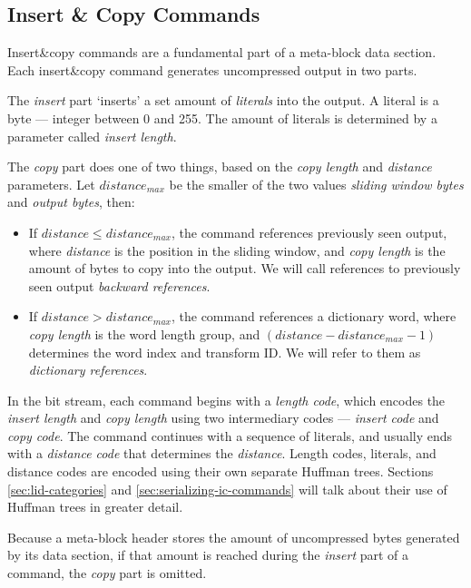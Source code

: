 \documentclass[english,master,dept460,male,cpp,cpdeclaration]{diploma}
\newcommand{\nosep}{\itemsep0em}
\begin{document}
	\subsection{Insert \& Copy Commands}
	
	Insert\&copy commands are a fundamental part of a meta-block data section. Each insert\&copy command generates uncompressed output in two parts.
	
	The \emph{insert} part \enquote*{inserts} a set amount of \emph{literals} into the output. A literal is a byte --- integer between 0 and 255. The amount of literals is determined by a parameter called \emph{insert length}.
	
	The \emph{copy} part does one of two things, based on the \emph{copy length} and \emph{distance} parameters. Let $distance_{max}$ be the smaller of the two values \emph{sliding window bytes} and \emph{output bytes}, then:
	
	\begin{itemize} \nosep
		\item If $distance \leq distance_{max}$, the command references previously seen output, where \emph{distance} is the position in the sliding window, and \emph{copy length} is the amount of bytes to copy into the output. We will call references to previously seen output \emph{backward references}.
		\item If $distance > distance_{max}$, the command references a dictionary word, where \emph{copy length} is the word length group, and $(distance - distance_{max} - 1)$ determines the word index and transform ID. We will refer to them as \emph{dictionary references}.
	\end{itemize}
	
	\noindent
	In the bit stream, each command begins with a \emph{length code}, which encodes the \emph{insert length} and \emph{copy length} using two intermediary codes --- \emph{insert code} and \emph{copy code}. The command continues with a sequence of literals, and usually ends with a \emph{distance code} that determines the \emph{distance}. Length codes, literals, and distance codes are encoded using their own separate Huffman trees. Sections \ref{sec:lid-categories} and \ref{sec:serializing-ic-commands} will talk about their use of Huffman trees in greater detail.
	
	Because a meta-block header stores the amount of uncompressed bytes generated by its data section, if that amount is reached during the \emph{insert} part of a command, the \emph{copy} part is omitted.
	
\end{document}
